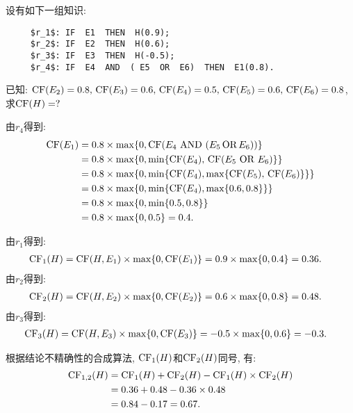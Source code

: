 \begin{example}
设有如下一组知识:
\begin{Verbatim}
     $r_1$: IF  E1  THEN  H(0.9);
     $r_2$: IF  E2  THEN  H(0.6);
     $r_3$: IF  E3  THEN  H(-0.5);
     $r_4$: IF  E4  AND  ( E5  OR  E6)  THEN  E1(0.8).
\end{Verbatim}
已知: $\textup{CF}(E_2)=0.8,\, \textup{CF}(E_3)=0.6,\, \textup{CF}(E_4)=0.5,\, \textup{CF}(E_5)=0.6,\, \textup{CF}(E_6)=0.8$, 求$\textup{CF}(H)=?$
\vspace{-0.2cm}
\end{example}
\begin{result}
由$r_4$得到:
\begin{align*}
    \textup{CF}(E_1)&=0.8\times \max\{ 0, \textup{CF}(E_4\,\, \textup{AND} \,\,  (E_5\,  \textup{OR}\,   E_6)) \}\\
          &=0.8\times \max\{ 0, \min\{\textup{CF}(E_4),\,  \textup{CF}(E_5\,\,   \textup{OR}\,\,    E_6)\} \}\\
          &=0.8\times \max\{ 0, \min\{\textup{CF}(E_4),  \max\{\textup{CF}(E_5),\,  \textup{CF}(E_6)\}\} \}\\
          &=0.8\times \max\{ 0, \min\{\textup{CF}(E_4),  \max\{0.6,  0.8\}\} \}\\
          &=0.8\times \max\{ 0, \min\{0.5,  0.8\} \}\\
          &=0.8\times \max\{ 0,  0.5 \} = 0.4.
\end{align*}
\end{result}
由$r_1$得到:
\begin{align*}
    \textup{CF}_1(H)&=\textup{CF}(H, E_1)\times \max\{0,  \textup{CF}(E_1)\}=0.9\times \max\{0,  0.4\} = 0.36.
\end{align*}
    由$r_2$得到:
\begin{align*}
    \textup{CF}_2(H)&=\textup{CF}(H, E_2)\times \max\{0,  \textup{CF}(E_2)\}=0.6\times \max\{0,  0.8\} = 0.48.
\end{align*}
由$r_3$得到:
\begin{align*}
    \textup{CF}_3(H)&=\textup{CF}(H, E_3)\times \max\{0,  \textup{CF}(E_3)\}=-0.5\times \max\{0,  0.6\} = -0.3.
\end{align*}

根据结论不精确性的合成算法, $\textup{CF}_1(H)$和$\textup{CF}_2(H)$同号, 有:
\begin{align}
  \begin{aligned}
  \textup{CF}_{1,2}(H) &=\textup{CF}_{1}(H)+\textup{CF}_{2}(H)-\textup{CF}_{1}(H) \times \textup{CF}_{2}(H) \\
  &=0.36+0.48-0.36 \times 0.48 \\
  &=0.84-0.17=0.67.
  \end{aligned}
\end{align}

